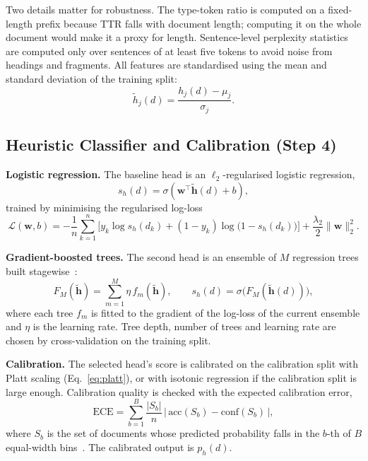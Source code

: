 Two details matter for robustness. The type-token ratio is computed on a
fixed-length prefix because TTR falls with document length; computing it on
the whole document would make it a proxy for length. Sentence-level perplexity
statistics are computed only over sentences of at least five tokens to avoid
noise from headings and fragments. All features are standardised using the
mean and standard deviation of the training split:
\begin{equation}
  \tilde{h}_j(d) = \frac{h_j(d) - \mu_j}{\sigma_j}.
  \label{eq:standardise}
\end{equation}

\subsection{Heuristic Classifier and Calibration (Step 4)}

\textbf{Logistic regression.} The baseline head is an $\ell_2$-regularised
logistic regression,
\begin{equation}
  s_h(d) = \sigma\!\left(\mathbf{w}^{\top}\tilde{\mathbf{h}}(d) + b\right),
  \label{eq:lr}
\end{equation}
trained by minimising the regularised log-loss
\begin{equation}
  \mathcal{L}(\mathbf{w},b) = -\frac{1}{n}\sum_{k=1}^{n}\Big[y_k \log s_h(d_k) + (1-y_k)\log\big(1-s_h(d_k)\big)\Big] + \frac{\lambda_2}{2}\lVert\mathbf{w}\rVert_2^2 .
  \label{eq:logloss}
\end{equation}

\textbf{Gradient-boosted trees.} The second head is an ensemble of $M$
regression trees built stagewise~\cite{chen2016xgboost}:
\begin{equation}
  F_M(\tilde{\mathbf{h}}) = \sum_{m=1}^{M} \eta\, f_m(\tilde{\mathbf{h}}), \qquad
  s_h(d) = \sigma\!\big(F_M(\tilde{\mathbf{h}}(d))\big),
  \label{eq:gbdt}
\end{equation}
where each tree $f_m$ is fitted to the gradient of the log-loss of the current
ensemble and $\eta$ is the learning rate. Tree depth, number of trees and
learning rate are chosen by cross-validation on the training split.

\textbf{Calibration.} The selected head's score is calibrated on the
calibration split with Platt scaling (Eq.~\eqref{eq:platt}), or with isotonic
regression if the calibration split is large enough. Calibration quality is
checked with the expected calibration error,
\begin{equation}
  \mathrm{ECE} = \sum_{b=1}^{B} \frac{|S_b|}{n}\,\big|\,\mathrm{acc}(S_b) - \mathrm{conf}(S_b)\,\big|,
  \label{eq:ece}
\end{equation}
where $S_b$ is the set of documents whose predicted probability falls in the
$b$-th of $B$ equal-width bins~\cite{guo2017calibration}. The calibrated output
is $p_h(d)$.

